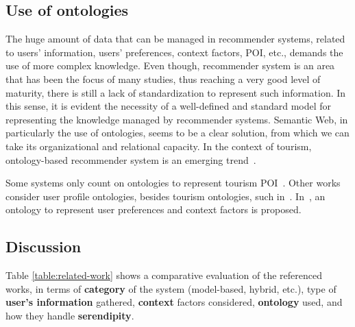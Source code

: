 
\subsection{Use of ontologies}

The huge amount of data that can be managed in recommender systems, related to users' information, users' preferences, context factors, POI, etc.,   demands the use of more complex knowledge. Even though, recommender system is an area that has been the focus of many studies, thus reaching a very good level of maturity, there is still a lack of standardization to represent such information. In this sense, it is evident the necessity of a well-defined and standard model for representing the knowledge managed by recommender systems. Semantic Web, in particularly the use of ontologies, seems to be a clear solution, from which we can take its organizational and relational capacity.
In the context of tourism, ontology-based  recommender  system  is  an  emerging  trend~\cite{borras2014intelligent,yochum2020linked}.

Some systems only count on ontologies to represent tourism  POI~\cite{rajaonarivo2019rec,bahramian_abbaspour_claramunt_2017,garcia2009speta,arigi2018context}. Other works consider user profile ontologies, besides tourism ontologies, such in~\cite{ruotsalo2013smartmuseum}. In~\cite{alonso2012ontology}, an ontology to represent user preferences and context factors is proposed.






\subsection{Discussion}

Table \ref{table:related-work} shows a comparative evaluation  of the referenced works, in terms of \textbf{category} of the system (model-based, hybrid, etc.), type of \textbf{user's information} gathered, \textbf{context} factors considered, \textbf{ontology} used, and how they handle \textbf{serendipity}. 

